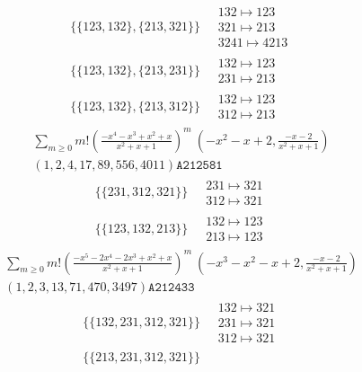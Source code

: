 \begin{scriptsize}
\begin{align}
\\
\{\{123, 132\}, \{213, 321\}\}
\ 
&
\begin{matrix}
132 \mapsto 123\\321 \mapsto 213\\3241 \mapsto 4213
\end{matrix}
\\
\{\{123, 132\}, \{213, 231\}\}
\ 
&
\begin{matrix}
132 \mapsto 123\\231 \mapsto 213
\end{matrix}
\\
\{\{123, 132\}, \{213, 312\}\}
\ 
&
\begin{matrix}
132 \mapsto 123\\312 \mapsto 213
\end{matrix}
\end{align}
$$
\begin{matrix}
\sum_{m \geq 0} m! \left(
\frac{-x^{4} - x^{3} + x^{2} + x}{x^{2} + x + 1}
\right)^m
\ 
\left(-x^{2} - x + 2, \frac{-x - 2}{x^{2} + x + 1}\right)
\\
\left(1, 2, 4, 17, 89, 556, 4011\right)
\texttt{A212581}
\end{matrix}
$$
\begin{align}
\{\{231, 312, 321\}\}
\ 
&
\begin{matrix}
231 \mapsto 321\\312 \mapsto 321
\end{matrix}
\\
\{\{123, 132, 213\}\}
\ 
&
\begin{matrix}
132 \mapsto 123\\213 \mapsto 123
\end{matrix}
\end{align}
$$
\begin{matrix}
\sum_{m \geq 0} m! \left(
\frac{-x^{5} - 2 x^{4} - 2 x^{3} + x^{2} + x}{x^{2} + x + 1}
\right)^m
\ 
\left(-x^{3} - x^{2} - x + 2, \frac{-x - 2}{x^{2} + x + 1}\right)
\\
\left(1, 2, 3, 13, 71, 470, 3497\right)
\texttt{A212433}
\end{matrix}
$$
\begin{align}
\{\{132, 231, 312, 321\}\}
\ 
&
\begin{matrix}
132 \mapsto 321\\231 \mapsto 321\\312 \mapsto 321
\end{matrix}
\\
\{\{213, 231, 312, 321\}\}
\ 
&
\begin{matrix}

\end{matrix}
\end{align}
\end{scriptsize}
